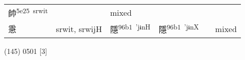 \documentclass[14pt,a4paper]{scrartcl}
\begin{document}
\begin{longtable}[c]{@{}llllll@{}}
\begin{minipage}[t]{0.14\columnwidth}\raggedright\strut
帥\textsuperscript{5e25~srwit}
\strut\end{minipage} &
\begin{minipage}[t]{0.14\columnwidth}\raggedright\strut
\strut\end{minipage} &
\begin{minipage}[t]{0.14\columnwidth}\raggedright\strut
mixed
\strut\end{minipage}\tabularnewline
\begin{minipage}[t]{0.14\columnwidth}\raggedright\strut
㥯
\strut\end{minipage} &
\begin{minipage}[t]{0.14\columnwidth}\raggedright\strut
srwit, srwijH
\strut\end{minipage} &
\begin{minipage}[t]{0.14\columnwidth}\raggedright\strut
隱\textsuperscript{96b1~'jɨnH}
\strut\end{minipage} &
\begin{minipage}[t]{0.14\columnwidth}\raggedright\strut
隱\textsuperscript{96b1~'jɨnX}
\strut\end{minipage} &
\begin{minipage}[t]{0.14\columnwidth}\raggedright\strut
\strut\end{minipage} &
\begin{minipage}[t]{0.14\columnwidth}\raggedright\strut
mixed
\strut\end{minipage}\tabularnewline
\bottomrule
\end{longtable}

(145) 0501 {[}3{]}
\end{document}

